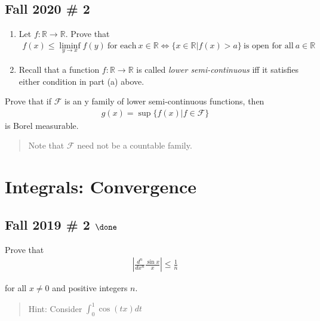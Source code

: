 \hypertarget{fall-2020-2}{%
\subsection{Fall 2020 \# 2}\label{fall-2020-2}}

\begin{enumerate}
\def\labelenumi{\alph{enumi}.}
\item
  Let \(f: {\mathbb{R}}\to {\mathbb{R}}\). Prove that
  \begin{align*}
  f(x) \leq \liminf_{y\to x} f(y)~ \text{for each}~ x\in {{\mathbb{R}}} \iff \{ x\in {{\mathbb{R}}} \mathrel{\Big|}f(x) > a \}~\text{is open for all}~ a\in {{\mathbb{R}}}
  \end{align*}
\item
  Recall that a function \(f: {{\mathbb{R}}} \to {{\mathbb{R}}}\) is
  called \emph{lower semi-continuous} iff it satisfies either condition
  in part (a) above.
\end{enumerate}

Prove that if \(\mathcal{F}\) is an y family of lower semi-continuous
functions, then
\begin{align*}
g(x) = \sup\{ f(x) \mathrel{\Big|}f\in \mathcal{F}\}
\end{align*}
is Borel measurable.

\begin{quote}
Note that \(\mathcal{F}\) need not be a countable family.
\end{quote}

\hypertarget{integrals-convergence}{%
\section{Integrals: Convergence}\label{integrals-convergence}}

\hypertarget{fall-2019-2-done}{%
\subsection{\texorpdfstring{Fall 2019 \# 2
\(\done\)}{Fall 2019 \# 2 \textbackslash done}}\label{fall-2019-2-done}}

Prove that
\begin{align*}
\left| \frac{d^{n}}{d x^{n}} \frac{\sin x}{x}\right| \leq \frac{1}{n}
\end{align*}

for all \(x \neq 0\) and positive integers \(n\).

\begin{quote}
Hint: Consider \(\displaystyle\int_0^1 \cos(tx) dt\)
\end{quote}

